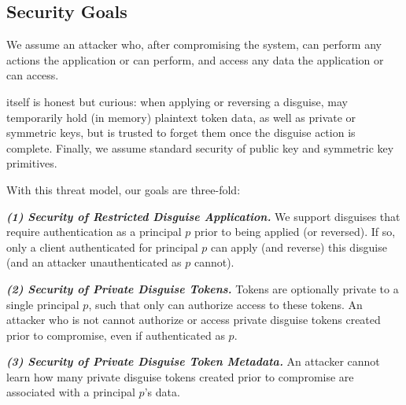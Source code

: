 \subsection{Security Goals}
We assume an attacker who, after compromising the system, can perform any actions the
application or \sys can perform, and access any data the application or \sys can access.

\sys itself is honest but curious: when applying or reversing a disguise, \sys may temporarily
hold (in memory) plaintext token data, as well as private or symmetric keys, but is trusted to
forget them once the disguise action is complete. 
Finally, we assume standard security of public key and symmetric key primitives.

With this threat model, our goals are three-fold: 

\vspace{6pt}\noindent\textbf{\emph{(1) Security of Restricted Disguise Application.}}
We support disguises that require authentication as a principal $p$ prior to being
applied (or reversed). If so, only a client authenticated for principal $p$ can apply (and reverse) this disguise (and an attacker unauthenticated as $p$ cannot).

\vspace{6pt}\noindent\textbf{\emph{(2) Security of Private Disguise Tokens.} }
Tokens are optionally private to a single principal $p$, such that only  can authorize
access to these tokens. An attacker who is not  cannot
authorize or access private disguise tokens created prior to compromise, even if authenticated as $p$.

\vspace{6pt}\noindent\textbf{\emph{(3) Security of Private Disguise Token Metadata.}}
An attacker cannot learn how many private disguise tokens created prior to compromise are associated with a principal $p$'s data.

